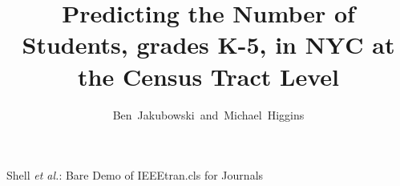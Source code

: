 \documentclass[journal]{IEEEtran}
\begin{document}
%

\title{Predicting the Number of Students, grades K-5, in NYC at the Census Tract Level}
%
%
%

\author{Ben~Jakubowski~and~Michael~Higgins}

% 
%



%
{Shell \MakeLowercase{\textit{et al.}}: Bare Demo of IEEEtran.cls for Journals}
% 




\end{document}
